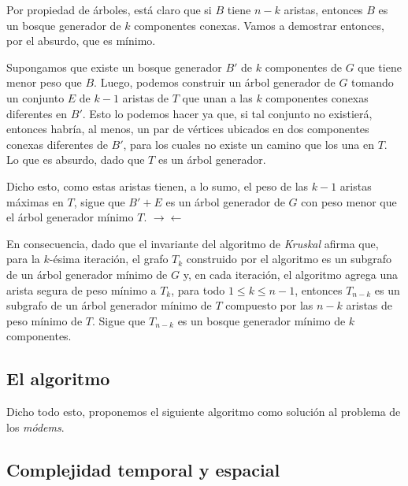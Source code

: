 Por propiedad de árboles, está claro que si $B$ tiene $n - k$ aristas, entonces $B$ es un bosque generador de $k$ componentes conexas. Vamos a demostrar entonces, por el absurdo, que es mínimo.

Supongamos que existe un bosque generador $B'$ de $k$ componentes de $G$ que tiene menor peso que $B$. Luego, podemos construir un árbol generador de $G$ tomando un conjunto $E$ de $k-1$ aristas de $T$ que unan a las $k$ componentes conexas diferentes en $B'$. Esto lo podemos hacer ya que, si tal conjunto no existierá, entonces habría, al menos, un par de vértices ubicados en dos componentes conexas diferentes de $B'$, para los cuales no existe un camino que los una en $T$. Lo que es absurdo, dado que $T$ es un árbol generador.

Dicho esto, como estas aristas tienen, a lo sumo, el peso de las $k-1$ aristas máximas en $T$, sigue que $B' + E$ es un árbol generador de $G$ con peso menor que el árbol generador mínimo $T$. $\rightarrow\leftarrow$  

En consecuencia, dado que el invariante del algoritmo de \textit{Kruskal} afirma que, para la $k$-ésima iteración, el grafo $T_k$ construido por el algoritmo es un subgrafo de un árbol generador mínimo de $G$ y, en cada iteración, el algoritmo agrega una arista segura de peso mínimo a $T_k$, para todo $1 \leq k \leq n-1$, entonces $T_{n-k}$ es un subgrafo de un árbol generador mínimo de $T$ compuesto por las $n-k$ aristas de peso mínimo de $T$. Sigue que $T_{n-k}$ es un bosque generador mínimo de $k$ componentes.

\subsection{El algoritmo} Dicho todo esto, proponemos el siguiente algoritmo como solución al problema de los \textit{módems}.

\subsection{Complejidad temporal y espacial}
